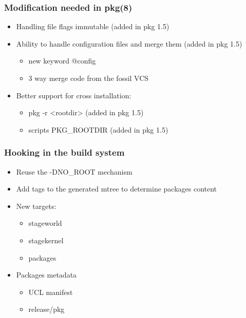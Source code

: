 \begin{frame}
	\frametitle{Modification needed in pkg(8)}
	\begin{itemize}
		\item Handling file flags immutable (added in pkg 1.5)
		\item Ability to handle configuration files and merge them (added in pkg 1.5)
			\begin{itemize}
				\item new keyword @config
				\item 3 way merge code from the fossil VCS
			\end{itemize}
		\item Better support for cross installation:
			\begin{itemize}
				\item pkg -r <rootdir> (added in pkg 1.5)
				\item scripts PKG\_ROOTDIR (added in pkg 1.5)
			\end{itemize}
	\end{itemize}
\end{frame}

\begin{frame}
	\frametitle{Hooking in the build system}
	\begin{itemize}
		\item Reuse the -DNO\_ROOT mechanism
		\item Add tags to the generated mtree to determine packages content
		\item New targets:
			\begin{itemize}
				\item stageworld
				\item stagekernel
				\item packages
			\end{itemize}
		\item Packages metadata
			\begin{itemize}
				\item UCL manifest
				\item release/pkg
			\end{itemize}
	\end{itemize}
\end{frame}

